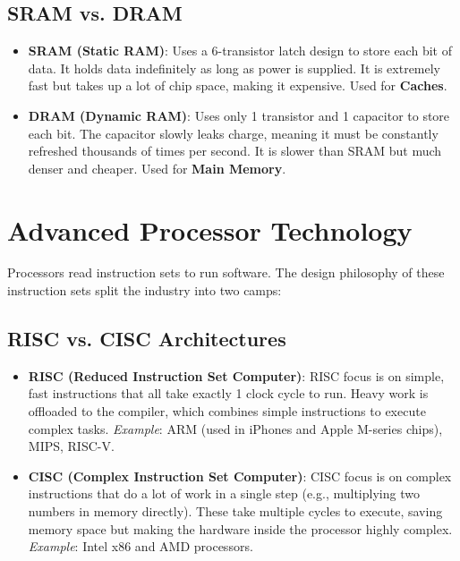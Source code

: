 \documentclass[11pt,a4paper]{article}
\begin{document}
\subsection{SRAM vs. DRAM}
\begin{itemize}
    \item \textbf{SRAM (Static RAM)}: Uses a 6-transistor latch design to store each bit of data. It holds data indefinitely as long as power is supplied. It is extremely fast but takes up a lot of chip space, making it expensive. Used for \textbf{Caches}.
    \item \textbf{DRAM (Dynamic RAM)}: Uses only 1 transistor and 1 capacitor to store each bit. The capacitor slowly leaks charge, meaning it must be constantly refreshed thousands of times per second. It is slower than SRAM but much denser and cheaper. Used for \textbf{Main Memory}.
\end{itemize}

\section{Advanced Processor Technology}

Processors read instruction sets to run software. The design philosophy of these instruction sets split the industry into two camps:

\subsection{RISC vs. CISC Architectures}
\begin{itemize}
    \item \textbf{RISC (Reduced Instruction Set Computer)}:
    RISC focus is on simple, fast instructions that all take exactly 1 clock cycle to run. Heavy work is offloaded to the compiler, which combines simple instructions to execute complex tasks.
    \textit{Example}: ARM (used in iPhones and Apple M-series chips), MIPS, RISC-V.
    
    \item \textbf{CISC (Complex Instruction Set Computer)}:
    CISC focus is on complex instructions that do a lot of work in a single step (e.g., multiplying two numbers in memory directly). These take multiple cycles to execute, saving memory space but making the hardware inside the processor highly complex.
    \textit{Example}: Intel x86 and AMD processors.
\end{itemize}
\end{document}
